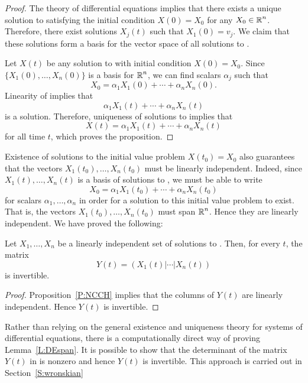 \documentclass{ximera}
\begin{document}
\begin{proof} The theory of differential equations implies that there exists a 
unique solution to   satisfying the initial condition $X(0)=X_0$ 
for any $X_0\in\mbox{$\Bbb{R}$}^n$.   Therefore, there exist solutions $X_j(t)$ such that 
$X_1(0)=v_j$.  We claim that these solutions form a basis for the vector 
space of all solutions to .   

Let $X(t)$ be any solution to  with initial condition $X(0)=X_0$. 
Since $\{X_1(0),\ldots,X_n(0)\}$ is a basis for $\mbox{$\Bbb{R}$}^n$, we can find scalars 
$\alpha_j$ such that 
\[
X_0 = \alpha_1X_1(0) + \cdots + \alpha_nX_n(0).
\]
Linearity of  implies that 
\[
\alpha_1X_1(t) + \cdots + \alpha_nX_n(t)
\]
is a solution.  Therefore, uniqueness of solutions to  implies 
that 
\[
X(t) = \alpha_1X_1(t) + \cdots + \alpha_nX_n(t)
\]
for all time $t$, which proves the proposition. \end{proof}

Existence of solutions to the initial value problem $X(t_0)=X_0$ also
guarantees that the vectors $X_1(t_0),\ldots,X_n(t_0)$ must be linearly 
independent.  
Indeed, since $X_1(t),\ldots,X_n(t)$ is a 
basis of solutions to
, we must be able to write 
\[
X_0 = \alpha_1X_1(t_0) + \cdots + \alpha_nX_n(t_0)
\]
for scalars $\alpha_1,\ldots,\alpha_n$ in order for a solution to this 
initial value problem to exist.  That is, the vectors 
$X_1(t_0),\ldots,X_n(t_0)$  must span $\mbox{$\Bbb{R}$}^n$.   Hence they are linearly 
independent.  We have proved the following:

\begin{lemma}  \label{L:DEspan}
Let $X_1,\ldots,X_n$ be a linearly independent 
set of solutions to .
Then, for every $t$, the matrix 
\begin{equation}   \label{E:Y(t)}
Y(t) = \left(X_1(t)|\cdots |X_n(t)\right) 
\end{equation}
is invertible.
\end{lemma}

\begin{proof}  Proposition~\ref{P:NCCH} implies that the columns of $Y(t)$ are 
linearly independent.  Hence $Y(t)$ is invertible.  \end{proof}

Rather than relying on the general existence and uniqueness theory for
systems of differential equations, there is a computationally direct way of 
proving Lemma~\ref{L:DEspan}.   It is possible to show that the determinant 
of the matrix $Y(t)$ in  is nonzero and hence $Y(t)$ is invertible.
This approach is carried out in Section~\ref{S:wronskian}
\end{document}
